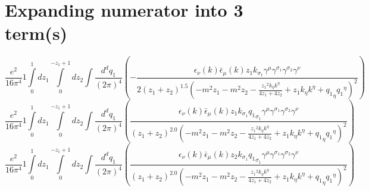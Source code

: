 \section*{Expanding numerator into 3 term(s)}
\begin{dmath}\frac{e^{2}}{16 \pi^{4}}1\int\limits_{ 0 }^{ 1 } d{ z_{ 1 } }\int\limits_{ 0 }^{ - { z_{ 1 } } + 1 } d{ z_{ 2 } }\int\frac{d^d q_1 }{ (2\pi)^4 }\left(- \frac{\epsilon_{ \nu }({ k }) \bar{\epsilon}_{ \mu }({ k }) { z_{ 1 } } { { k }_{ \sigma_1 } } { \gamma^{ \mu } } { \gamma^{ \sigma_1 } } { \gamma^{ \sigma_2 } } { \gamma^{ \nu } }}{2 \left({ z_{ 1 } } + { z_{ 2 } }\right)^{1.5} \left(- m^{2} { z_{ 1 } } - m^{2} { z_{ 2 } } - \frac{{ z_{ 1 } }^{2} { { k }_{ \eta } } { { k }^{ \eta } }}{4 { z_{ 1 } } + 4 { z_{ 2 } }} + { z_{ 1 } } { { k }_{ \eta } } { { k }^{ \eta } } + { { q_1 }_{ \eta } } { { q_1 }^{ \eta } }\right)^{2}}\right)\end{dmath}
\begin{dmath}\frac{e^{2}}{16 \pi^{4}}1\int\limits_{ 0 }^{ 1 } d{ z_{ 1 } }\int\limits_{ 0 }^{ - { z_{ 1 } } + 1 } d{ z_{ 2 } }\int\frac{d^d q_1 }{ (2\pi)^4 }\left(\frac{\epsilon_{ \nu }({ k }) \bar{\epsilon}_{ \mu }({ k }) { z_{ 1 } } { { k }_{ \sigma_1 } } { { q_1 }_{ \sigma_1 } } { \gamma^{ \mu } } { \gamma^{ \sigma_1 } } { \gamma^{ \sigma_2 } } { \gamma^{ \nu } }}{\left({ z_{ 1 } } + { z_{ 2 } }\right)^{2.0} \left(- m^{2} { z_{ 1 } } - m^{2} { z_{ 2 } } - \frac{{ z_{ 1 } }^{2} { { k }_{ \eta } } { { k }^{ \eta } }}{4 { z_{ 1 } } + 4 { z_{ 2 } }} + { z_{ 1 } } { { k }_{ \eta } } { { k }^{ \eta } } + { { q_1 }_{ \eta } } { { q_1 }^{ \eta } }\right)^{2}}\right)\end{dmath}
\begin{dmath}\frac{e^{2}}{16 \pi^{4}}1\int\limits_{ 0 }^{ 1 } d{ z_{ 1 } }\int\limits_{ 0 }^{ - { z_{ 1 } } + 1 } d{ z_{ 2 } }\int\frac{d^d q_1 }{ (2\pi)^4 }\left(\frac{\epsilon_{ \nu }({ k }) \bar{\epsilon}_{ \mu }({ k }) { z_{ 2 } } { { k }_{ \sigma_1 } } { { q_1 }_{ \sigma_1 } } { \gamma^{ \mu } } { \gamma^{ \sigma_1 } } { \gamma^{ \sigma_2 } } { \gamma^{ \nu } }}{\left({ z_{ 1 } } + { z_{ 2 } }\right)^{2.0} \left(- m^{2} { z_{ 1 } } - m^{2} { z_{ 2 } } - \frac{{ z_{ 1 } }^{2} { { k }_{ \eta } } { { k }^{ \eta } }}{4 { z_{ 1 } } + 4 { z_{ 2 } }} + { z_{ 1 } } { { k }_{ \eta } } { { k }^{ \eta } } + { { q_1 }_{ \eta } } { { q_1 }^{ \eta } }\right)^{2}}\right)\end{dmath}
